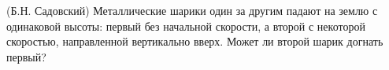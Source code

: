 (Б.Н. Садовский)
Металлические шарики один за другим падают на землю с одинаковой
высоты: первый без начальной скорости, а второй с некоторой скоростью,
направленной вертикально вверх. Может ли второй шарик догнать первый?
